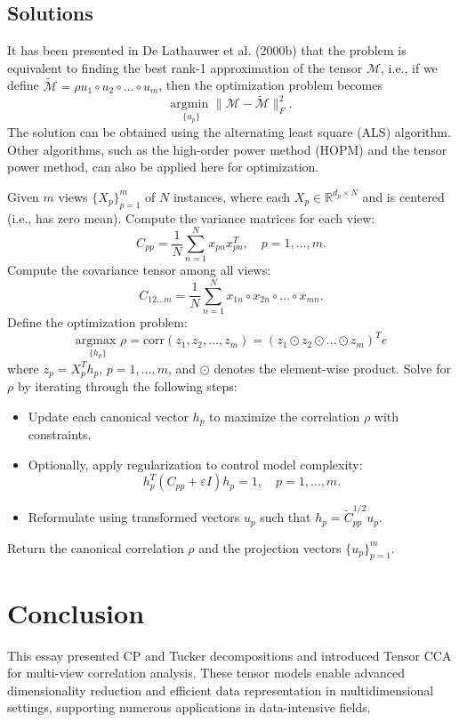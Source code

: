 \documentclass[a4paper,14pt]{article}
\renewcommand{\epsilon}{\ensuremath{\varepsilon}}
\theoremstyle{plain} %
\theoremstyle{definition} %
\theoremstyle{remark} %
\theoremstyle{definition}
\theoremstyle{remark}
\theoremstyle{remark}
\begin{document}
	\subsection{Solutions}
	
	It has been presented in De Lathauwer et al. (2000b) that the problem is equivalent to finding the best rank-1 approximation of the tensor $\mathcal{M}$, i.e., if we define $\tilde{\mathcal{M}} = \rho u_1 \circ u_2 \circ \dots \circ u_m$, then the optimization problem becomes
	\[
	\underset{\{u_p\}}{\text{argmin }} \|\mathcal{M} - \tilde{\mathcal{M}}\|_F^2.
	\]
	The solution can be obtained using the alternating least square (ALS) algorithm. Other algorithms, such as the high-order power method (HOPM) and the tensor power method, can also be applied here for optimization.

	\begin{algorithm}
		\caption{Tensor Canonical Correlation Analysis (TCCA)}
		\label{alg:TCCA}
		\begin{algorithmic}
			\State Given $m$ views $\{X_p\}_{p=1}^m$ of $N$ instances, where each $X_p \in \mathbb{R}^{d_p \times N}$ and is centered (i.e., has zero mean).
			\State Compute the variance matrices for each view:
			\[
			C_{pp} = \frac{1}{N} \sum_{n=1}^N x_{pn} x_{pn}^T, \quad p = 1, \dots, m.
			\]
			\State Compute the covariance tensor among all views:
			\[
			C_{12\ldots m} = \frac{1}{N} \sum_{n=1}^N x_{1n} \circ x_{2n} \circ \dots \circ x_{mn}.
			\]
			\State Define the optimization problem:
			\[
			\underset{\{h_p\}}{\text{argmax }} \rho = \text{corr}(z_1, z_2, \ldots, z_m) = (z_1 \odot z_2 \odot \dots \odot z_m)^T e
			\]
			where $z_p = X_p^T h_p$, $p = 1, \dots, m$, and $\odot$ denotes the element-wise product.
			\State Solve for $\rho$ by iterating through the following steps:
			\begin{itemize}
				\item Update each canonical vector $h_p$ to maximize the correlation $\rho$ with constraints.
				\item Optionally, apply regularization to control model complexity:
				\[
				h_p^T (C_{pp} + \epsilon I) h_p = 1, \quad p = 1, \dots, m.
				\]
				\item Reformulate using transformed vectors $u_p$ such that $h_p = \tilde{C}_{pp}^{1/2} u_p$.
			\end{itemize}
			\State Return the canonical correlation $\rho$ and the projection vectors $\{u_p\}_{p=1}^m$.
			\EndProcedure
		\end{algorithmic}
	\end{algorithm}
	
	\section{Conclusion}
	This essay presented CP and Tucker decompositions and introduced Tensor CCA for multi-view correlation analysis. These tensor models enable advanced dimensionality reduction and efficient data representation in multidimensional settings, supporting numerous applications in data-intensive fields.
	
	\nocite{*}
	\printbibliography
	
\end{document}
